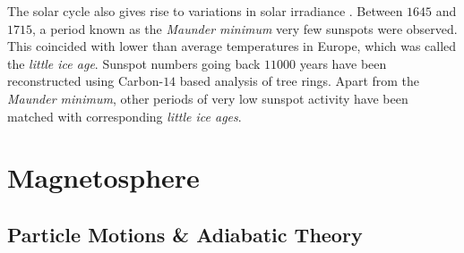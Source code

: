The solar cycle also gives rise to variations in solar irradiance \citep{solarirradiance}. Between $1645$ and 
$1715$, a period known as the \emph{Maunder minimum} very few sunspots were observed. This coincided with lower 
than average temperatures in Europe, which was called the \emph{little ice age}. Sunspot numbers going back $11000$ 
years have been reconstructed using Carbon-$14$ based analysis of tree rings. Apart from the \emph{Maunder minimum},
other periods of very low sunspot activity have been matched with corresponding \emph{little ice ages}.

\section{Magnetosphere}\label{sec:mag}

\subsection{Particle Motions \& Adiabatic Theory} \label{sec:plasmadiff}

\clearpage



